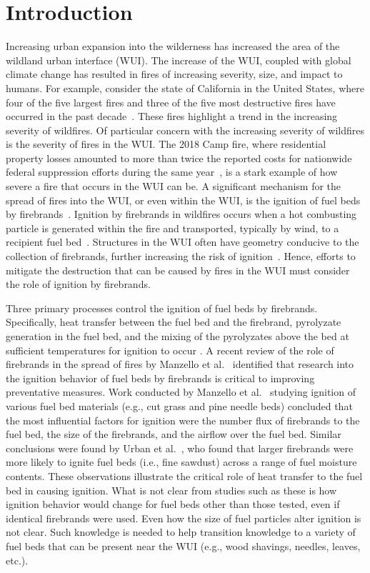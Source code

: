 \section{Introduction}
     Increasing urban expansion into the wilderness has increased the area of the wildland urban interface (WUI). The increase of the WUI, coupled with global climate change has resulted in fires of increasing severity, size, and impact to humans. For example, consider the state of California in the United States, where four of the five largest fires and three of the five most destructive fires have occurred in the past decade~\cite{CalFire2019, CALFIRE2018}. These fires highlight a trend in the increasing severity of wildfires. Of particular concern with the increasing severity of wildfires is the severity of fires in the WUI. The 2018 Camp fire, where residential property losses amounted to more than twice the reported costs for nationwide federal suppression efforts during the same year~\cite{USDOI/USDA2019, Insurance2019}, is a stark example of how severe a fire that occurs in the WUI can be. A significant mechanism for the spread of fires into the WUI, or even within the WUI, is the ignition of fuel beds by firebrands~\cite{Mell2010, Maranghides2013NISTIgnitions}. Ignition by firebrands in wildfires occurs when a hot combusting particle is generated within the fire and transported, typically by wind, to a recipient fuel bed~\cite{Koo2010a}. Structures in the WUI often have geometry conducive to the collection of firebrands, further increasing the risk of ignition~\cite{Suzuki2020}. Hence, efforts to mitigate the destruction that can be caused by fires in the WUI must consider the role of ignition by firebrands.
     
    Three primary processes control the ignition of fuel beds by firebrands. Specifically, heat transfer between the fuel bed and the firebrand, pyrolyzate generation in the fuel bed, and the mixing of the pyrolyzates above the bed at sufficient temperatures for ignition to occur \cite{Babrauskas2003}. A recent review of the role of firebrands in the spread of fires by Manzello et al.~\cite{Manzello2020} identified that research into the ignition behavior of fuel beds by firebrands is critical to improving preventative measures. Work conducted by Manzello et al.~\cite{Manzello2006a, Manzello2006, Manzello2008} studying ignition of various fuel bed materials (e.g., cut grass and pine needle beds) concluded that the most influential factors for ignition were the number flux of firebrands to the fuel bed, the size of the firebrands, and the airflow over the fuel bed. Similar conclusions were found by Urban et al.~\cite{Urban2019a}, who found that larger firebrands were more likely to ignite fuel beds (i.e., fine sawdust) across a range of fuel moisture contents. These observations illustrate the critical role of heat transfer to the fuel bed in causing ignition. What is not clear from studies such as these is how ignition behavior would change for fuel beds other than those tested, even if identical firebrands were used. Even how the size of fuel particles alter ignition is not clear. Such knowledge is needed to help transition knowledge to a variety of fuel beds that can be present near the WUI (e.g., wood shavings, needles, leaves, etc.). 
    
